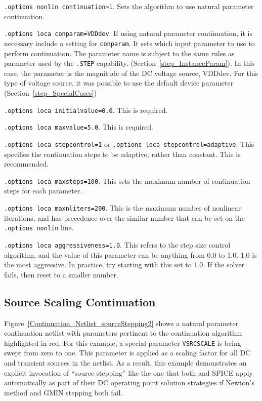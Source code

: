 \begin{XyceItemize}
\item \texttt{.options nonlin continuation=1}.  Sets the algorithm to use natural
parameter continuation.
\item \texttt{.options loca conparam=VDDdev}.  If using natural parameter continuation, it is necessary include a setting for \texttt{conparam}.  It sets which input parameter to use to perform continuation.  The parameter name is subject to the same rules as parameter used by the \texttt{.STEP} capability. (Section~\ref{step_InstanceParam}).  In this case, the parameter is the
magnitude of the DC voltage source, VDDdev.  For this type of voltage
source, it was possible to use the default device parameter (Section~\ref{step_SpecialCases})
\item \texttt{.options loca initialvalue=0.0}.  This is required.
\item \texttt{.options loca maxvalue=5.0}.  This is required.
\item \texttt{.options loca stepcontrol=1} or \texttt{.options loca stepcontrol=adaptive}.  This specifies the continuation steps to be adaptive, rather than constant.  This is recommended.
\item \texttt{.options loca maxsteps=100}.  This sets the maximum number of continuation 
steps for each parameter.  
\item \texttt{.options loca maxnliters=200}.  This is the maximum number of nonlinear 
iterations, and has precedence over the similar number that can be set on
the \texttt{.options nonlin} line.
\item \texttt{.options loca aggressiveness=1.0}.  This refers to the step size 
control algorithm,
and the value of this parameter can be anything from 0.0 to 1.0.  1.0 is
the most aggressive.  In practice, try starting with this set to 1.0. 
If the solver fails, then reset to a smaller number.
\end{XyceItemize}

\subsection{Source Scaling Continuation}
\label{continuation_scaling}

Figure~\ref{Continuation_Netlist_sourceStepping2} shows a natural
parameter continuation netlist with parameters pertinent to the
continuation algorithm highlighted in red.  For this example, a
special parameter \texttt{VSRCSCALE} is being swept from zero to one.
This parameter is applied as a scaling factor for all DC and transient 
sources in the netlist.  As a result, this example demonstrates an
explicit invocation of ``source stepping'' like the one that both
\Xyce{} and SPICE apply automatically as part of their DC operating
point solution strategies if Newton's method and GMIN stepping both
fail.


